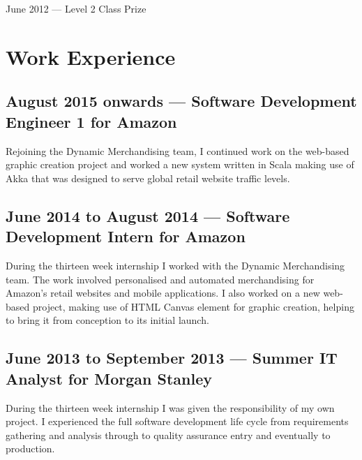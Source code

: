 \documentclass[11pt,a4paper]{article}
\begin{document}
June 2012 --- Level 2 Class Prize

\section*{Work Experience}

\subsection*{August 2015 onwards --- Software Development Engineer 1 for Amazon}

Rejoining the Dynamic Merchandising team, I continued work on the web-based graphic
creation project and worked a new system written in Scala making use of Akka that was
designed to serve global retail website traffic levels. 

\subsection*{June 2014 to August 2014 --- Software Development Intern for Amazon}

During the thirteen week internship I worked with the Dynamic Merchandising
team. The work involved personalised and automated merchandising for Amazon's
retail websites and mobile applications. I also worked on a new web-based project,
making use of HTML Canvas element for graphic creation, helping to bring it from
conception to its initial launch.

\subsection*{June 2013 to September 2013 --- Summer IT Analyst for Morgan Stanley}

During the thirteen week internship I was given the responsibility of my own
project. I experienced the full software development life cycle from
requirements gathering and analysis through to quality assurance entry and
eventually to production.
\end{document}
